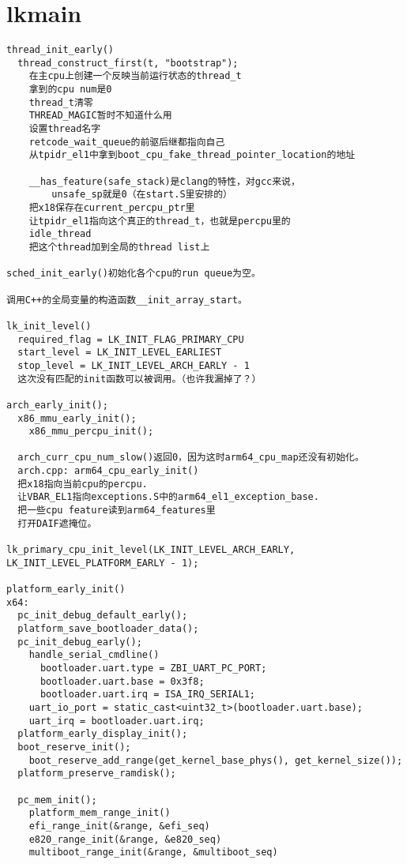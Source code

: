 \section{lkmain}
\begin{verbatim}
thread_init_early()
  thread_construct_first(t, "bootstrap");
    在主cpu上创建一个反映当前运行状态的thread_t
    拿到的cpu num是0
    thread_t清零
    THREAD_MAGIC暂时不知道什么用
    设置thread名字
    retcode_wait_queue的前驱后继都指向自己
    从tpidr_el1中拿到boot_cpu_fake_thread_pointer_location的地址

    __has_feature(safe_stack)是clang的特性，对gcc来说，
        unsafe_sp就是0（在start.S里安排的）
    把x18保存在current_percpu_ptr里
    让tpidr_el1指向这个真正的thread_t，也就是percpu里的
    idle_thread
    把这个thread加到全局的thread list上

sched_init_early()初始化各个cpu的run queue为空。

调用C++的全局变量的构造函数__init_array_start。

lk_init_level()
  required_flag = LK_INIT_FLAG_PRIMARY_CPU
  start_level = LK_INIT_LEVEL_EARLIEST
  stop_level = LK_INIT_LEVEL_ARCH_EARLY - 1
  这次没有匹配的init函数可以被调用。（也许我漏掉了？）

arch_early_init();
  x86_mmu_early_init();
    x86_mmu_percpu_init();

  arch_curr_cpu_num_slow()返回0，因为这时arm64_cpu_map还没有初始化。
  arch.cpp: arm64_cpu_early_init()
  把x18指向当前cpu的percpu.
  让VBAR_EL1指向exceptions.S中的arm64_el1_exception_base.
  把一些cpu feature读到arm64_features里
  打开DAIF遮掩位。

lk_primary_cpu_init_level(LK_INIT_LEVEL_ARCH_EARLY, LK_INIT_LEVEL_PLATFORM_EARLY - 1);

platform_early_init()
x64:
  pc_init_debug_default_early();
  platform_save_bootloader_data();
  pc_init_debug_early();
    handle_serial_cmdline()
      bootloader.uart.type = ZBI_UART_PC_PORT;
      bootloader.uart.base = 0x3f8;
      bootloader.uart.irq = ISA_IRQ_SERIAL1;
    uart_io_port = static_cast<uint32_t>(bootloader.uart.base);
    uart_irq = bootloader.uart.irq;
  platform_early_display_init();
  boot_reserve_init();
    boot_reserve_add_range(get_kernel_base_phys(), get_kernel_size());
  platform_preserve_ramdisk();

  pc_mem_init();
    platform_mem_range_init()
    efi_range_init(&range, &efi_seq)
    e820_range_init(&range, &e820_seq)
    multiboot_range_init(&range, &multiboot_seq)


\end{verbatim}
